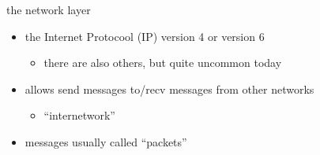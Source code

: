 \usetikzlibrary{calc,positioning,shapes.callouts}

\begin{frame}{the network layer}
\begin{itemize}
\item the Internet Protocool (IP) version 4 or version 6
    \begin{itemize}
    \item there are also others, but quite uncommon today
    \end{itemize}
\item allows send messages to/recv messages from other networks
    \begin{itemize}
    \item ``internetwork''
    \end{itemize}
\item messages usually called ``packets''
\end{itemize}
\end{frame}
